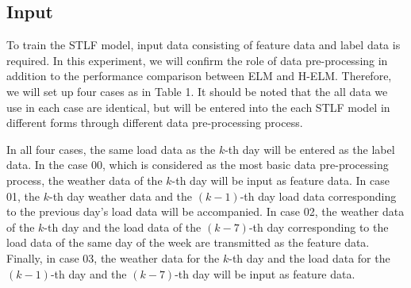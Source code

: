 \documentclass[runningheads,a4paper]{llncs}
\begin{document}
\subsection{Input}

To train the STLF model, input data consisting of feature data and label data is required. In this experiment, we will confirm the role of data pre-processing in addition to the performance comparison between ELM and H-ELM. Therefore, we will set up four cases as in Table 1. It should be noted that the all data we use in each case are identical, but will be entered into the each STLF model in different forms through different data pre-processing process. 

In all four cases, the same load data as the $k$-th day will be entered as the label data. In the case 00, which is considered as the most basic data pre-processing process, the weather data of the $k$-th day will be input as feature data. In case 01, the $k$-th day weather data and the $\left ( k-1 \right )$-th day load data corresponding to the previous day's load data will be accompanied. In case 02, the weather data of the $k$-th day and the load data of the $\left ( k-7 \right )$-th day corresponding to the load data of the same day of the week are transmitted as the feature data. Finally, in case 03, the weather data for the $k$-th day and the load data for the $\left ( k-1 \right )$-th day and the $\left ( k-7 \right )$-th day will be input as feature data.
\end{document}
